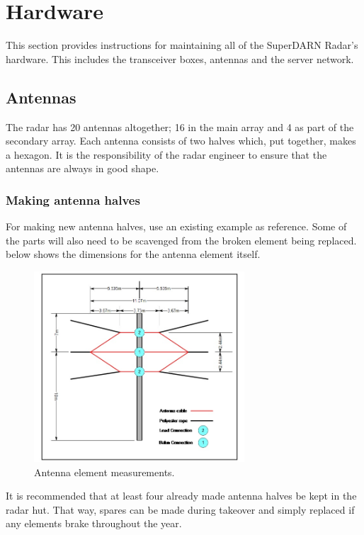 \section{Hardware}
\label{sec:hardware}

This section provides instructions for maintaining all of the SuperDARN Radar's hardware. This includes the transceiver boxes, antennas and the server network.

\subsection{Antennas}
\label{subsec:hw_antennas}
The radar has 20 antennas altogether; 16 in the main array and 4 as part of the secondary array. Each antenna consists of two halves which, put together, makes a hexagon. It is the responsibility of the radar engineer to ensure that the antennas are always in good shape.

\subsubsection{Making antenna halves}
For making new antenna halves, use an existing example as reference. Some of the parts will also need to be scavenged from the broken element being replaced.  below shows the dimensions for the antenna element itself.

\begin{figure}[H]
	\centering
	\includegraphics[width=0.7\textwidth]{images/hardware/element.jpg}
	\caption{Antenna element measurements.}
	\label{fig:hw_element}
\end{figure}

It is recommended that at least four already made antenna halves be kept in the radar hut. That way, spares can be made during takeover and simply replaced if any elements brake throughout the year.


